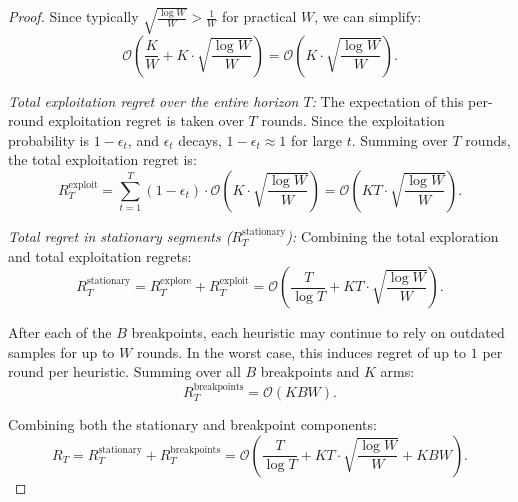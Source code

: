 \documentclass[review]{jair}
\begin{document}
\begin{proof}
Since typically $\sqrt{\frac{\log W}{W}} > \frac{1}{W}$ for practical $W$, we can simplify:
\begin{equation}
\mathcal{O}\left( \frac{K}{W} + K \cdot \sqrt{\frac{\log W}{W}} \right) = \mathcal{O}\left( K \cdot \sqrt{\frac{\log W}{W}} \right).
\end{equation}

\noindent \textit{Total exploitation regret over the entire horizon $T$:} \newline
The expectation of this per-round exploitation regret is taken over $T$ rounds. Since the exploitation probability is $1-\epsilon_t$, and $\epsilon_t$ decays, $1-\epsilon_t \approx 1$ for large $t$. Summing over $T$ rounds, the total exploitation regret is:
\begin{equation}
R_T^{\text{exploit}} = \sum_{t=1}^T (1-\epsilon_t) \cdot \mathcal{O}\left( K \cdot \sqrt{\frac{\log W}{W}} \right) = \mathcal{O}\left( K T \cdot \sqrt{\frac{\log W}{W}} \right).
\end{equation}

\noindent \textit{Total regret in stationary segments ($R_T^{\text{stationary}}$):} \newline
Combining the total exploration and total exploitation regrets:
\begin{equation}
R_T^{\text{stationary}} = R_T^{\text{explore}} + R_T^{\text{exploit}} = \mathcal{O}\left( \frac{T}{\log T} + K T \cdot \sqrt{\frac{\log W}{W}} \right).
\end{equation}

\noindent {}

After each of the $B$ breakpoints, each heuristic may continue to rely on outdated samples for up to $W$ rounds. In the worst case, this induces regret of up to $1$ per round per heuristic. Summing over all $B$ breakpoints and $K$ arms:
\begin{equation}
R_T^{\text{breakpoints}} = \mathcal{O}(K B W).
\end{equation}

\noindent {}

Combining both the stationary and breakpoint components:
\begin{equation}
R_T = R_T^{\text{stationary}} + R_T^{\text{breakpoints}} = \mathcal{O}\left( \frac{T}{\log T} + K T \cdot \sqrt{\frac{\log W}{W}} + K B W \right).
\end{equation}
\end{proof}
\end{document}
